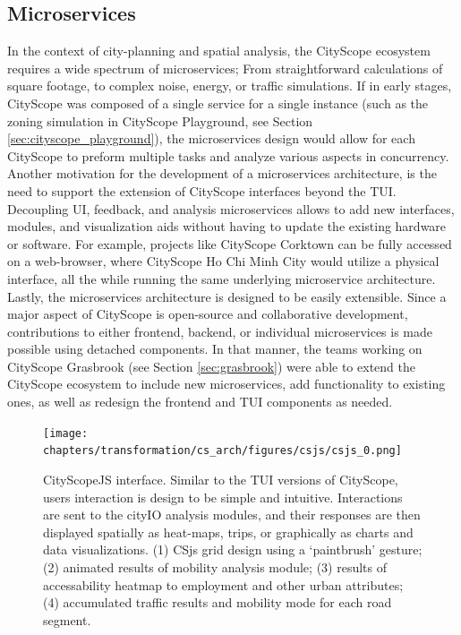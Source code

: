 {{      \subsection{Microservices}
      {
          In the context of city-planning and spatial analysis, the CityScope ecosystem requires a wide spectrum of microservices; From straightforward calculations of square footage, to complex noise, energy, or traffic simulations. If in early stages, CityScope was composed of a single service for a single instance (such as the zoning simulation in CityScope Playground, see Section \eqref{sec:cityscope_playground}), the microservices design would allow for each CityScope to preform multiple tasks and analyze various aspects in concurrency.
          \newline
          Another motivation for the development of a microservices architecture, is the need to support the extension of CityScope interfaces beyond the TUI. Decoupling UI, feedback, and analysis microservices allows to add new interfaces, modules, and visualization aids without having to update the existing hardware or software. For example, projects like CityScope Corktown can be fully accessed on a web-browser, where CityScope Ho Chi Minh City would utilize a physical interface, all the while running the same underlying microservice architecture.
          \newline
          Lastly, the microservices architecture is designed to be easily extensible. Since a major aspect of CityScope is open-source and collaborative development, contributions to either frontend, backend, or individual microservices is made possible using detached components. In that manner, the teams working on CityScope Grasbrook (see Section \eqref{sec:grasbrook}) were able to extend the CityScope ecosystem to include new microservices, add functionality to existing ones, as well as redesign the frontend and TUI components as needed.
      }


      \begin{figure}[!htb]
          \begin{center}
              \texttt{[image: chapters/transformation/cs\_arch/figures/csjs/csjs\_0.png]}
          \end{center}
          \caption{CityScopeJS interface. Similar to the TUI versions of CityScope, users interaction is design to be simple and intuitive. Interactions are sent to the cityIO analysis modules, and their responses are then displayed spatially as heat-maps, trips, or graphically as charts and data visualizations. (1) CSjs grid design using a `paintbrush' gesture; (2) animated results of mobility analysis module; (3) results of accessability heatmap to employment and other urban attributes; (4) accumulated traffic results and mobility mode for each road segment.}
          \label{fig:csjs}
      \end{figure}



}}
